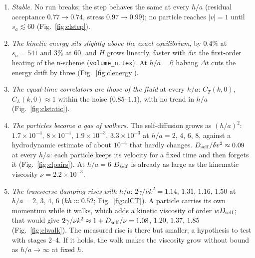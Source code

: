 \documentclass[11pt,aps,preprint,nofootinbib,superscriptaddress,tightenlines]{revtex4-2}
\def\Fig#1{Fig.~\ref{#1}}
\begin{document}
\begin{enumerate}
\item \emph{Stable.}  No run breaks; the step behaves the same at every $h/a$ (residual acceptance
  $0.77\to0.74$, stress $0.97\to0.99$); no particle reaches $|v|=1$ until $s_a\lesssim60$
  (\Fig{fig:clstep}).
\item \emph{The kinetic energy sits slightly above the exact equilibrium}, by $0.4\%$ at $s_a=541$ and
  $3\%$ at $60$, and $H$ grows linearly, faster with $\delta v$: the first-order heating of the
  n-scheme (\texttt{volume\_n.tex}).  At $h/a=6$ halving $\Delta t$ cuts the energy drift by three
  (\Fig{fig:clenergy}).
\item \emph{The equal-time correlators are those of the fluid} at every $h/a$:
  $C_T(k,0)$, $C_L(k,0)\approx1$ within the noise ($0.85$--$1.1$), with no trend in $h/a$ (\Fig{fig:clstatic}).
\item \emph{The particles become a gas of walkers.}  The self-diffusion grows as $(h/a)^2$:
  $1.7\times10^{-4}$, $8\times10^{-4}$, $1.9\times10^{-3}$, $3.3\times10^{-3}$ at $h/a=2$, $4$, $6$, $8$, against a
  hydrodynamic estimate of about $10^{-4}$ that hardly changes.  $D_{\rm self}/\delta v^2\approx0.09$
  at every $h/a$: each particle keeps its velocity for a fixed time and then forgets it
  (\Fig{fig:clpairs}).  At $h/a=6$ $D_{\rm self}$ is already as large as the kinematic viscosity
  $\nu=2.2\times10^{-3}$.
\item \emph{The transverse damping rises with $h/a$}: $2\gamma/\nu k^2=1.14$, $1.31$, $1.16$, $1.50$ at
  $h/a=2$, $3$, $4$, $6$ ($kh\approx0.52$; \Fig{fig:clCT}).  A particle carries its own momentum while it
  walks, which adds a kinetic viscosity of order $wD_{\rm self}$; that would give
  $2\gamma/\nu k^2\approx1+D_{\rm self}/\nu=1.08$, $1.20$, $1.37$, $1.85$ (\Fig{fig:clwalk}).  The measured rise is
  there but smaller; a hypothesis to test with stages 2--4.  If it holds, the walk makes the
  viscosity grow without bound as $h/a\to\infty$ at fixed $h$.
\end{enumerate}
\end{document}
